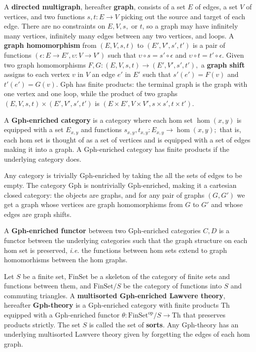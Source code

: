 \documentclass{llncs}
\newcommand{\maps}{\colon}
\newcommand{\Th}{\mathrm{Th}}
\newcommand{\FinSet}{\mathrm{FinSet}}
\newcommand{\op}{\mathrm{op}}
\begin{document}
A {\bf directed multigraph}, hereafter {\bf graph}, consists of a set $E$ of edges, a set $V$ of vertices, and two functions $s,t\maps E \to V$ picking out the source and target of each edge.  There are no constraints on $E, V, s,$ or $t$, so a graph may have infinitely many vertices, infinitely many edges between any two vertices, and loops.  A {\bf graph homomorphism} from $(E, V, s, t)$ to $(E', V', s', t')$ is a pair of functions $(\epsilon\maps E \to E', \upsilon\maps V \to V')$ such that $\upsilon\circ s = s' \circ \epsilon$ and $\upsilon\circ t = t' \circ \epsilon$.  Given two graph homomorphisms $F, G\maps (E, V, s, t) \to (E', V', s', t'),$ a {\bf graph shift} assigns to each vertex $v$ in $V$ an edge $e'$ in $E'$ such that $s'(e') = F(v)$ and $t'(e') = G(v).$  Gph has finite products: the terminal graph is the graph with one vertex and one loop, while the product of two graphs $(E, V, s, t) \times (E', V', s', t')$ is $(E \times E', V \times V', s \times s', t\times t').$

A {\bf Gph-enriched category} is a category where each hom set $\hom(x,y)$ is equipped with a set $E_{x,y}$ and functions $s_{x,y}, t_{x,y}\maps E_{x,y} \to \hom(x,y);$ that is, each hom set is thought of as a set of vertices and is equipped with a set of edges making it into a graph.  A Gph-enriched category has finite products if the underlying category does.

Any category is trivially Gph-enriched by taking the all the sets of edges to be empty.  The category Gph is nontrivially Gph-enriched, making it a cartesian closed category: the objects are graphs, and for any pair of graphs $(G, G')$ we get a graph whose vertices are graph homomorphisms from $G$ to $G'$ and whose edges are graph shifts.

A {\bf Gph-enriched functor} between two Gph-enriched categories $C, D$ is a functor between the underlying categories such that the graph structure on each hom set is preserved, {\em i.e.} the functions between hom sets extend to graph homomorhisms between the hom graphs.

Let $S$ be a finite set, $\FinSet$ be a skeleton of the category of finite sets and functions between them, and $\FinSet/S$ be the category of functions into $S$ and commuting triangles.  A {\bf multisorted Gph-enriched Lawvere theory}, hereafter {\bf Gph-theory} is a Gph-enriched category with finite products Th equipped with a Gph-enriched functor $\theta\maps \FinSet^{\op}/S \to \Th$ that preserves products strictly.  The set $S$ is called the set of {\bf sorts}.  Any Gph-theory has an underlying multisorted Lawvere theory given by forgetting the edges of each hom graph.
\end{document}
